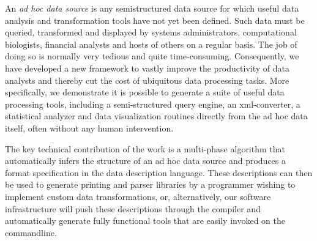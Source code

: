 An {\em ad hoc data source} is any semistructured data source for
which useful data analysis and transformation tools have not yet been
defined.  Such data must be queried, transformed and displayed by
systems administrators, computational biologists, financial analysts
and hosts of others on a regular basis.  The job of doing so is
normally very tedious and quite time-consuming.  Consequently, we have
developed a new framework to vastly improve the productivity of data
analysts and thereby cut the cost of ubiquitous data processing tasks.
More specifically, we demonstrate it is possible to generate a suite
of useful data processing tools, including a semi-structured query
engine, an xml-converter, a statistical analyzer and data
visualization routines directly from the ad hoc data itself, often
without any human intervention.  

The key technical contribution of the work is a multi-phase algorithm
that automatically infers the structure of an ad hoc data source and
produces a format specification in the \pads{} data description
language.  These descriptions can then be used to generate printing
and parser libraries by a programmer wishing to implement custom data
transformations, or, alternatively, our software infrastructure will
push these descriptions through the \pads{} compiler and automatically
generate fully functional tools that are easily invoked on the
commandline.
